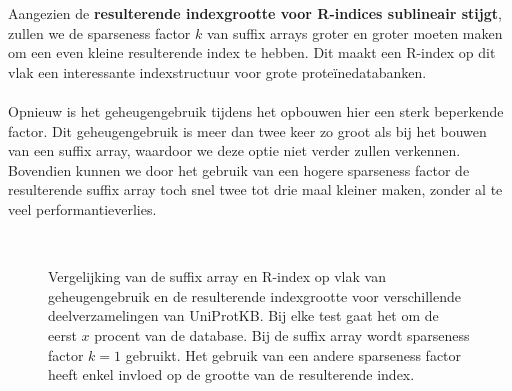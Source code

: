Aangezien de \textbf{resulterende indexgrootte voor R-indices sublineair stijgt}, zullen we de sparseness factor $k$ van suffix arrays groter en groter moeten maken om een even kleine resulterende index te hebben.
Dit maakt een R-index op dit vlak een interessante indexstructuur voor grote proteïnedatabanken.
\\ \\
Opnieuw is het geheugengebruik tijdens het opbouwen hier een sterk beperkende factor.
Dit geheugengebruik is meer dan twee keer zo groot als bij het bouwen van een suffix array, waardoor we deze optie niet verder zullen verkennen.
Bovendien kunnen we door het gebruik van een hogere sparseness factor de resulterende suffix array toch snel twee tot drie maal kleiner maken, zonder al te veel performantieverlies.

\begin{figure}[H]
    \centering
    \\[4ex] %

    \caption{Vergelijking van de suffix array en R-index op vlak van geheugengebruik en de resulterende indexgrootte voor verschillende deelverzamelingen van UniProtKB. Bij elke test gaat het om de eerst $x$ procent van de database. Bij de suffix array wordt sparseness factor $k = 1$ gebruikt. Het gebruik van een andere sparseness factor heeft enkel invloed op de grootte van de resulterende index.}\label{fig:sa_vs_r_index}
\end{figure}


